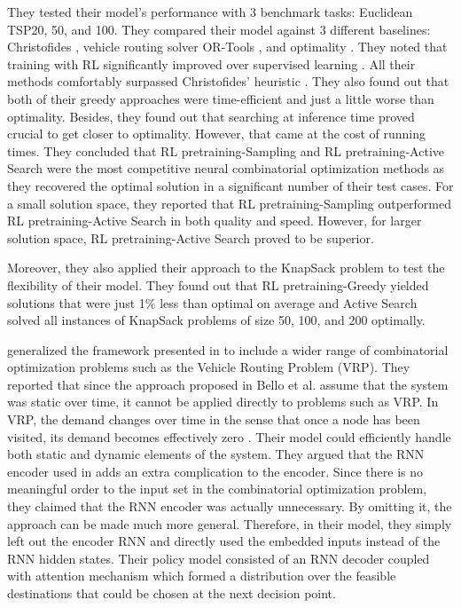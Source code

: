 \documentclass{article}
\begin{document}
They tested their model's performance with 3 benchmark tasks: Euclidean TSP20, 50, and 100. They compared their model against 3 different baselines: Christofides \cite{christofides1976worst}, vehicle routing solver OR-Tools \cite{google}, and optimality \cite{applegate2006traveling}. They noted that training with RL significantly improved over supervised learning \cite{vinyals2015pointer}. All their methods comfortably surpassed Christofides' heuristic \cite{christofides1976worst}. They also found out that both of their greedy approaches were time-efficient and just a little worse than optimality. Besides, they found out that searching at inference time proved crucial to get closer to optimality. However, that came at the cost of running times. They concluded that RL pretraining-Sampling and RL pretraining-Active Search were the most competitive neural combinatorial optimization methods as they recovered the optimal solution in a significant number of their test cases. For a small solution space, they reported that RL pretraining-Sampling outperformed RL pretraining-Active Search in both quality and speed. However, for larger solution space, RL pretraining-Active Search proved to be superior. 

Moreover, they also applied their approach to the KnapSack problem to test the flexibility of their model. They found out that RL pretraining-Greedy yielded solutions that were just 1\% less than optimal on average and Active Search solved all instances of KnapSack problems of size 50, 100, and 200 optimally. 

\cite{nazari2018reinforcement} generalized the framework presented in \cite{bello2016neural} to include a wider range of combinatorial optimization problems such as the Vehicle Routing Problem (VRP). They reported that since the approach proposed in Bello et al. assume that the system was static over time, it cannot be applied directly to problems such as VRP. In VRP, the demand changes over time in the sense that once a node has been visited, its demand becomes effectively zero \cite{nazari2018reinforcement}. Their model could efficiently handle both static and dynamic elements of the system. They argued that the RNN encoder used in \cite{bello2016neural} adds an extra complication to the encoder. Since there is no meaningful order to the input set in the combinatorial optimization problem, they claimed that the RNN encoder was actually unnecessary. By omitting it, the approach can be made much more general. Therefore, in their model, they simply left out the encoder RNN and directly used the embedded inputs instead of the RNN hidden states. Their policy model consisted of an RNN decoder coupled with attention mechanism which formed a distribution over the feasible destinations that could be chosen at the next decision point.
\end{document}
